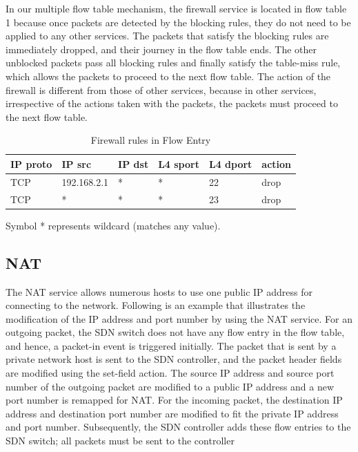 In our multiple flow table mechanism, the firewall service is located in flow table 1 because once packets are detected by the blocking rules, they do not need to be applied to any other services. The packets that satisfy the blocking rules are immediately dropped, and their journey in the flow table ends. The other unblocked packets pass all blocking rules and finally satisfy the table-miss rule, which allows the packets to proceed to the next flow table. The action of the firewall is different from those of other services, because in other services, irrespective of the actions taken with the packets, the packets must proceed to the next flow table.

\begin{table}[!t]
\caption{Firewall rules in Flow Entry}
\label{table:fw}
\centering
\begin{threeparttable}
\begin{tabular}{|l|l|l|l|l|l|}
\hline
IP proto & IP src      & IP dst       & L4 sport & L4 dport & action \\ \hline
TCP      & 192.168.2.1 & *            & *        & 22       & drop   \\ \hline
TCP      & *           & *            & *        & 23       & drop   \\ \hline
\end{tabular}
  \begin{tablenotes}
    \item[] Symbol * represents wildcard (matches any value).
  \end{tablenotes}
\end{threeparttable}
\end{table}


\subsection{NAT}
The NAT service allows numerous hosts to use one public IP address for connecting to the network. Following is an example that illustrates the modification of the IP address and port number by using the NAT service. For an outgoing packet, the SDN switch does not have any flow entry in the flow table, and hence, a packet-in event is triggered initially. The packet that is sent by a private network host is sent to the SDN controller, and the packet header fields are modified using the set-field action. The source IP address and source port number of the outgoing packet are modified to a public IP address and a new port number is remapped for NAT. For the incoming packet, the destination IP address and destination port number are modified to fit the private IP address and port number. Subsequently, the SDN controller adds these flow entries to the SDN switch; all packets must be sent to the controller

